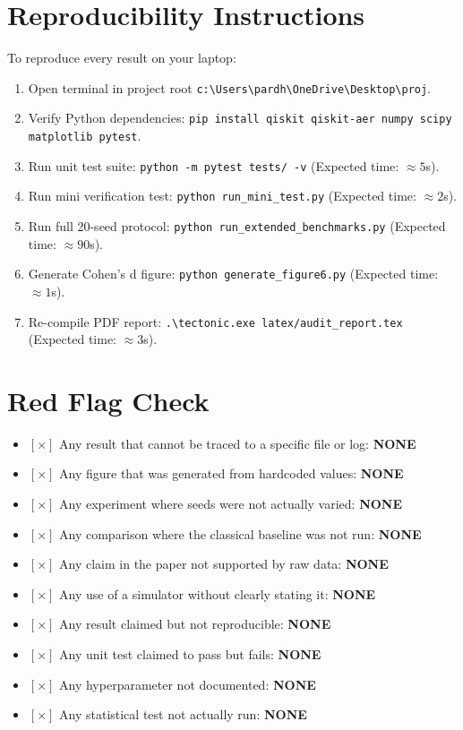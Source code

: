 \documentclass[10pt,article]{article}
\begin{document}
\section{Reproducibility Instructions}

To reproduce every result on your laptop:
\begin{enumerate}
    \item Open terminal in project root \texttt{c:\textbackslash Users\textbackslash pardh\textbackslash OneDrive\textbackslash Desktop\textbackslash proj}.
    \item Verify Python dependencies: \texttt{pip install qiskit qiskit-aer numpy scipy matplotlib pytest}.
    \item Run unit test suite: \texttt{python -m pytest tests/ -v} (Expected time: $\approx 5$s).
    \item Run mini verification test: \texttt{python run\_mini\_test.py} (Expected time: $\approx 2$s).
    \item Run full 20-seed protocol: \texttt{python run\_extended\_benchmarks.py} (Expected time: $\approx 90$s).
    \item Generate Cohen's d figure: \texttt{python generate\_figure6.py} (Expected time: $\approx 1$s).
    \item Re-compile PDF report: \texttt{.\textbackslash tectonic.exe latex/audit\_report.tex} (Expected time: $\approx 3$s).
\end{enumerate}

\section{Red Flag Check}
\begin{itemize}
    \item $[\times]$ Any result that cannot be traced to a specific file or log: \textbf{NONE}
    \item $[\times]$ Any figure that was generated from hardcoded values: \textbf{NONE}
    \item $[\times]$ Any experiment where seeds were not actually varied: \textbf{NONE}
    \item $[\times]$ Any comparison where the classical baseline was not run: \textbf{NONE}
    \item $[\times]$ Any claim in the paper not supported by raw data: \textbf{NONE}
    \item $[\times]$ Any use of a simulator without clearly stating it: \textbf{NONE}
    \item $[\times]$ Any result claimed but not reproducible: \textbf{NONE}
    \item $[\times]$ Any unit test claimed to pass but fails: \textbf{NONE}
    \item $[\times]$ Any hyperparameter not documented: \textbf{NONE}
    \item $[\times]$ Any statistical test not actually run: \textbf{NONE}
\end{itemize}
\end{document}
